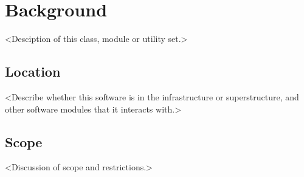 %

\section{Background}

<Desciption of this class, module or utility set.>

\subsection{Location}

<Describe whether this software is in the infrastructure or superstructure,
and other software modules that it interacts with.>

\subsection{Scope}

<Discussion of scope and restrictions.>





